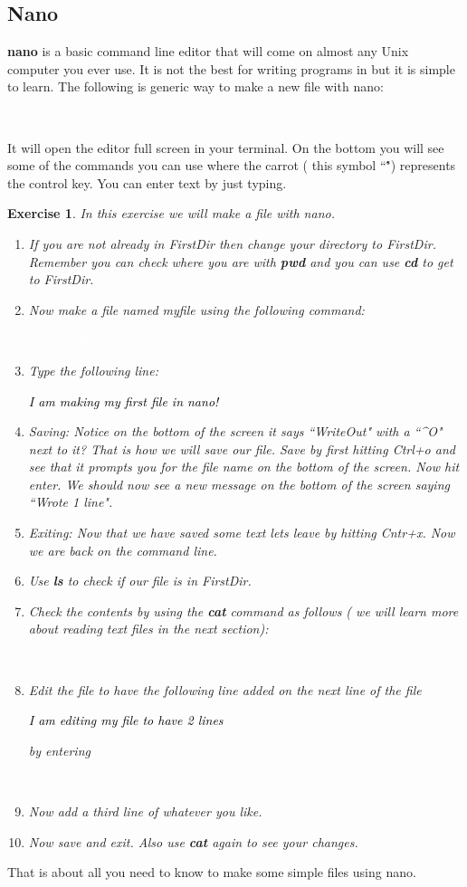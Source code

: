 \documentclass{book}
\newcommand{\commandline}[1]{\begin{center} \colorbox{Dark}{\textcolor{white}{#1}} \end{center}}
\newcommand{\exampleout}[1]{\begin{center} \colorbox{Light}{\textcolor{black}{#1}} \end{center}}
\newtheorem{ex}{Exercise}[chapter]
\begin{document}
\subsection{Nano}
\textbf{nano} is a basic command line editor that will come on almost any Unix computer you ever use. It is not the best for writing programs in but it is simple to learn. The following is generic way to make a new file with nano:
\commandline{nano newfilename}
It will open the editor full screen in your terminal. On the bottom you will see some of the commands you can use where the carrot ( this symbol ``\^") represents the control key. You can enter text by just typing.
\begin{ex} 
	In this exercise we will make a file with nano. \\
	\begin{enumerate} 
		\item If you are not already in FirstDir then change your directory to FirstDir. Remember you can check where you are with \textbf{pwd} and you can use \textbf{cd} to get to FirstDir.
		\item Now make a file named myfile using the following command:
			\commandline{nano myfile}
		\item Type the following line:
			\exampleout{I am making my first file in nano!}
		\item Saving: Notice on the bottom of the screen it says ``WriteOut" with a ``\^{}O" next to it? That is how we will save our file. Save by first hitting Ctrl+o and see that it prompts you for the file name on the bottom of the screen. Now hit enter. We should now see a new message on the bottom of the screen saying ``Wrote 1 line".
		\item Exiting: Now that we have saved some text lets leave by hitting Cntr+x. Now we are back on the command line.
		\item Use \textbf{ls} to check if our file is in FirstDir. 
		\item Check the contents by using the \textbf{cat} command as follows ( we will learn more about reading text files in the next section):
			\commandline{cat myfile}
		\item Edit the file to have the following line added on the next line of the file
			\exampleout{I am editing my file to have 2 lines}
			by entering
			\commandline{nano myfile}
		\item Now add a third line of whatever you like.
		\item Now save and exit. Also use \textbf{cat} again to see your changes.
	\end{enumerate}
\end{ex}
That is about all you need to know to make some simple files using nano.
\end{document}
